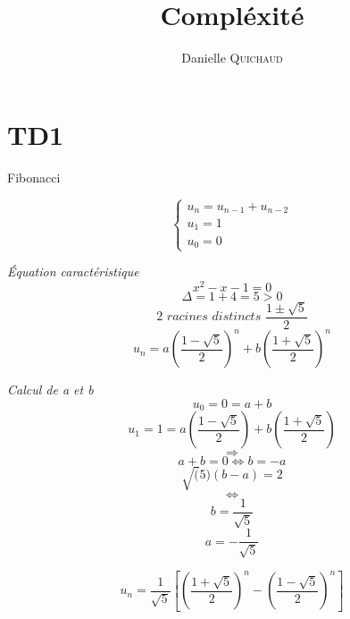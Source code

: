 \providecommand{\VarRectoVerso}{oneside}


%

\title{Compléxité}
\author{Danielle \textsc{Quichaud}}




\maketitle

\tableofcontents

\section{TD1}

\begin{exercice}{Fibonacci}

\[ \begin{cases} u_n = u_{n-1} + u_{n-2} \\ u_1 = 1 \\ u_0= 0 \end{cases} \]

\textit{Équation caractéristique} 
\[x^2-x-1 = 0\]
\[ \Delta = 1+4=5 >0 \]
\[ \textit{2 racines distincts } \frac{1 \pm \sqrt{5}}{2} \]
\[ u_n = a \left(\frac{1 - \sqrt{5}}{2}\right)^n + b \left(\frac{1 + \sqrt{5}}{2}\right)^n \]

\textit{Calcul de a et b} 
\[ u_0 = 0 = a +b \]
\[ u_1 = 1 = a \left(\frac{1 - \sqrt{5}}{2}\right) + b \left(\frac{1 + \sqrt{5}}{2}\right) \]
\[ \Rightarrow \]
\[ a + b = 0 \Leftrightarrow b = -a \]
\[ \sqrt(5) (b-a) = 2 \]
\[ \Leftrightarrow \]
\[ b = \frac{1}{\sqrt{5}} \]
\[ a = -\frac{1}{\sqrt{5}} \]

\[ u_n = \frac{1}{\sqrt{5}} \left[ \left( \frac{1 + \sqrt{5}}{2} \right)^n - \left( \frac{1 - \sqrt{5}}{2} \right)^n \right] \]


\end{exercice}

